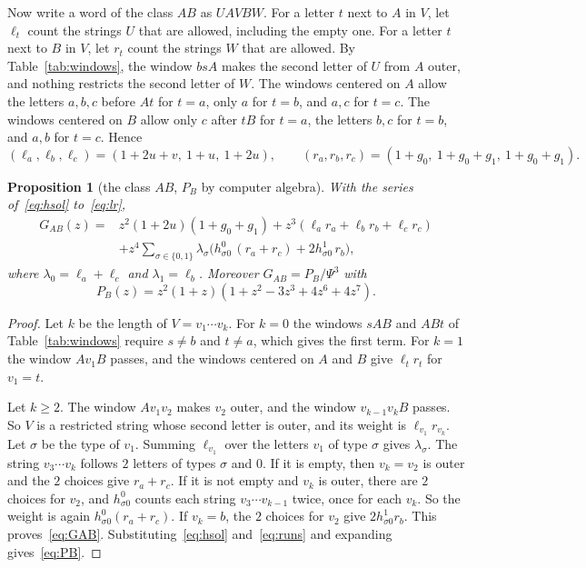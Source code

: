 \documentclass[12pt]{article}
\theoremstyle{plain}
\newtheorem{proposition}[theorem]{Proposition}
\theoremstyle{definition}
\theoremstyle{remark}
\begin{document}
Now write a word of the class $AB$ as $UAVBW$. For a letter $t$ next to $A$ in
$V$, let $\ell_t$ count the strings $U$ that are allowed, including the empty
one. For a letter $t$ next to $B$ in $V$, let $r_t$ count the strings $W$ that
are allowed. By Table~\ref{tab:windows}, the window $bsA$ makes the second
letter of $U$ from $A$ outer, and nothing restricts the second letter of
$W$. The windows centered on $A$ allow the letters $a,b,c$ before $At$ for
$t=a$, only $a$ for $t=b$, and $a,c$ for $t=c$. The windows centered on $B$
allow only $c$ after $tB$ for $t=a$, the letters $b,c$ for $t=b$, and $a,b$
for $t=c$. Hence
\begin{equation}\label{eq:lr}
(\ell_a,\ell_b,\ell_c)=(1+2u+v,\ 1+u,\ 1+2u),\qquad
(r_a,r_b,r_c)=(1+g_0,\ 1+g_0+g_1,\ 1+g_0+g_1).
\end{equation}

\begin{proposition}[the class $AB$, $P_B$ by computer algebra]\label{prop:GAB}
With the series of~\eqref{eq:hsol} to~\eqref{eq:lr},
\begin{equation}\label{eq:GAB}
\begin{aligned}
G_{AB}(z)={}&z^2(1+2u)(1+g_0+g_1)+z^3(\ell_ar_a+\ell_br_b+\ell_cr_c)\\
&+z^4\sum_{\sigma\in\{0,1\}}\lambda_\sigma\bigl(h^0_{\sigma0}\,(r_a+r_c)+2h^1_{\sigma0}\,r_b\bigr),
\end{aligned}
\end{equation}
where $\lambda_0=\ell_a+\ell_c$ and $\lambda_1=\ell_b$. Moreover $G_{AB}=P_B/\Psi^3$
with
\begin{equation}\label{eq:PB}
P_B(z)=z^2(1+z)(1+z^2-3z^3+4z^6+4z^7).
\end{equation}
\end{proposition}

\begin{proof}
Let $k$ be the length of $V=v_1\cdots v_k$. For $k=0$ the windows $sAB$ and
$ABt$ of Table~\ref{tab:windows} require $s\ne b$ and $t\ne a$, which gives the
first term. For $k=1$ the window $Av_1B$ passes, and the windows centered on
$A$ and $B$ give $\ell_tr_t$ for $v_1=t$.

Let $k\ge2$. The window $Av_1v_2$ makes $v_2$ outer, and the window
$v_{k-1}v_kB$ passes. So $V$ is a restricted string whose second letter is
outer, and its weight is $\ell_{v_1}r_{v_k}$. Let $\sigma$ be the type of
$v_1$. Summing $\ell_{v_1}$ over the letters $v_1$ of type $\sigma$ gives
$\lambda_\sigma$. The string $v_3\cdots v_k$ follows $2$ letters of types
$\sigma$ and $0$. If it is empty, then $v_k=v_2$ is outer and the $2$ choices
give $r_a+r_c$. If it is not empty and $v_k$ is outer, there are $2$ choices
for $v_2$, and $h^0_{\sigma0}$ counts each string $v_3\cdots v_{k-1}$ twice,
once for each $v_k$. So the weight is again $h^0_{\sigma0}(r_a+r_c)$. If
$v_k=b$, the $2$ choices for $v_2$ give $2h^1_{\sigma0}r_b$. This
proves~\eqref{eq:GAB}. Substituting~\eqref{eq:hsol} and~\eqref{eq:runs} and
expanding gives~\eqref{eq:PB}.
\end{proof}
\end{document}
